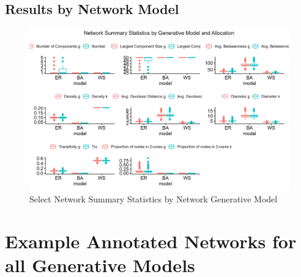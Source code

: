 \documentclass{article}
\theoremstyle{definition}
\begin{document}
\subsection{Results by Network Model}
\begin{figure}[H]
    \centering
    \includegraphics[width=\linewidth
    ]{Figures/Network Summary Statistics.png}
    \caption{Select Network Summary Statistics by Network Generative Model}
    \label{fig:Figure B1}
\end{figure}

\section{Example Annotated Networks for all Generative Models}



\end{document}
